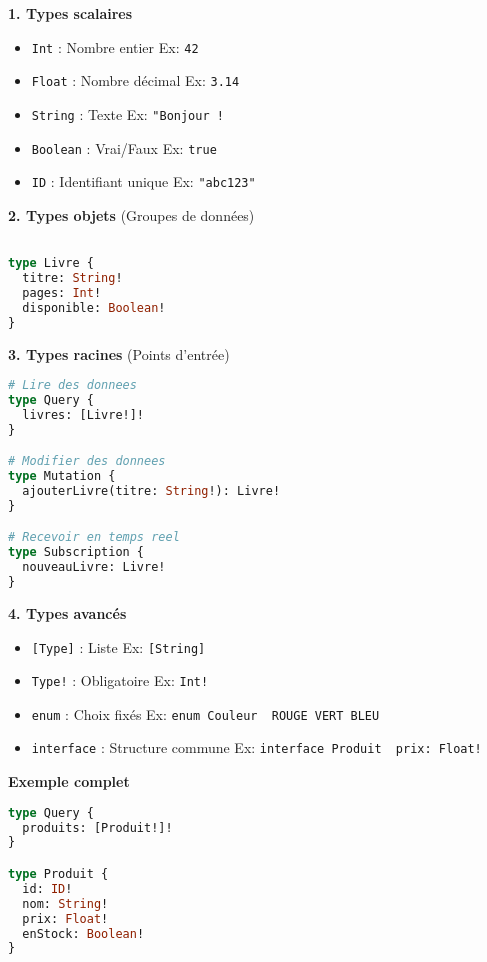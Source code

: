 \documentclass{article}
\begin{document}
\begin{tcolorbox}[
    title={\faCubes~ Les types GraphQL avec des simpleexemples},
    colback=blue!5!white,
    colframe=blue!75!black,
    width=\textwidth,
    breakable,
    ]
\textbf{1. Types scalaires \faAsterisk}
\begin{itemize}
    \item \texttt{Int} : Nombre entier \hfill Ex: \texttt{42}
    \item \texttt{Float} : Nombre décimal \hfill Ex: \texttt{3.14}
    \item \texttt{String} : Texte \hfill Ex: \texttt{"Bonjour ! \faSmileO}
    \item \texttt{Boolean} : Vrai/Faux \hfill Ex: \texttt{true}
    \item \texttt{ID} : Identifiant unique \hfill Ex: \texttt{"abc123"}
\end{itemize}

\textbf{2. Types objets \faCube} (Groupes de données)
\begin{lstlisting}[language=GraphQL]

type Livre {
  titre: String!
  pages: Int!
  disponible: Boolean!
}
\end{lstlisting}

\textbf{3. Types racines \faTerminal} (Points d'entrée)
\begin{lstlisting}[language=GraphQL]
# Lire des donnees
type Query {
  livres: [Livre!]!
}

# Modifier des donnees
type Mutation {
  ajouterLivre(titre: String!): Livre!
}

# Recevoir en temps reel
type Subscription {
  nouveauLivre: Livre!
}
\end{lstlisting}

\textbf{4. Types avancés \faPuzzlePiece}
\begin{itemize}
    \item \texttt{[Type]} : Liste \hfill Ex: \texttt{[String]}
    \item \texttt{Type!} : Obligatoire \hfill Ex: \texttt{Int!}
    \item \texttt{enum} : Choix fixés \hfill Ex: \texttt{enum Couleur { ROUGE VERT BLEU }}
    \item \texttt{interface} : Structure commune \hfill Ex: \texttt{interface Produit { prix: Float! }}
\end{itemize}

\textbf{Exemple complet \faCode}
\begin{lstlisting}[language=GraphQL]
type Query {
  produits: [Produit!]!
}

type Produit {
  id: ID!
  nom: String!
  prix: Float!
  enStock: Boolean!
}
\end{lstlisting}
\end{tcolorbox}
\end{document}

